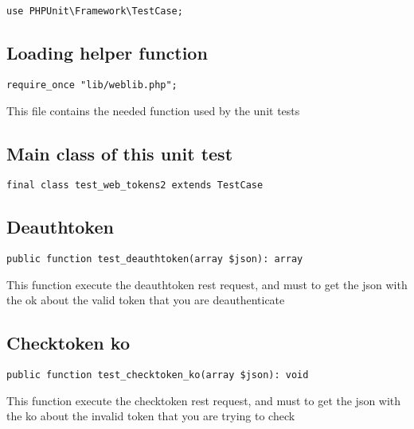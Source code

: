 \documentclass[a4paper]{book}
\begin{document}
\begin{lstlisting}
use PHPUnit\Framework\TestCase;
\end{lstlisting}

\hypertarget{toc85}{}
\subsection{Loading helper function}

\begin{lstlisting}
require_once "lib/weblib.php";
\end{lstlisting}

This file contains the needed function used by the unit tests

\hypertarget{toc86}{}
\subsection{Main class of this unit test}

\begin{lstlisting}
final class test_web_tokens2 extends TestCase
\end{lstlisting}

\hypertarget{toc87}{}
\subsection{Deauthtoken}

\begin{lstlisting}
public function test_deauthtoken(array $json): array
\end{lstlisting}

This function execute the deauthtoken rest request, and must to get the
json with the ok about the valid token that you are deauthenticate

\hypertarget{toc88}{}
\subsection{Checktoken ko}

\begin{lstlisting}
public function test_checktoken_ko(array $json): void
\end{lstlisting}

This function execute the checktoken rest request, and must to get the
json with the ko about the invalid token that you are trying to check

\end{document}

